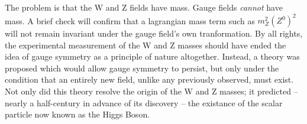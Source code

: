     The problem is that the W and Z fields have mass.
    Gauge fields \textit{cannot} have mass.
    A brief check will confirm that a lagrangian mass term such as $m_Z^2 (Z^0)^2$
        will not remain invariant under the gauge field's own tranformation.
    By all rights, the experimental measurement of the W and Z masses should have
        ended the idea of gauge symmetry as a principle of nature altogether.
    Instead, a theory was proposed which would allow gauge symmetry to persist,
        but only under the condition that an entirely new field, unlike any previously observed, must exist.
    Not only did this theory resolve the origin of the W and Z masses;
        it predicted -- nearly a half-century in advance of its discovery --
        the existance of the scalar particle now known as the Higgs Boson.
    
    \cite{Osborn_notes}
    \cite{Peskin_book}
    \cite{Halzen_book}

